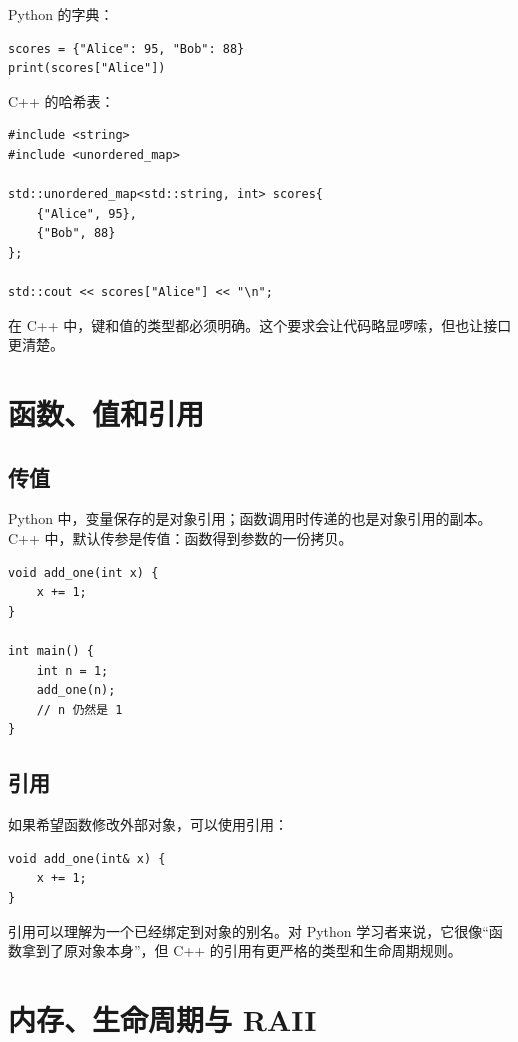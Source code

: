 \documentclass[UTF8,openany]{ctexbook}
\begin{document}
Python 的字典：

\begin{lstlisting}[style=pythonstyle]
scores = {"Alice": 95, "Bob": 88}
print(scores["Alice"])
\end{lstlisting}

C++ 的哈希表：

\begin{lstlisting}[style=cppstyle]
#include <string>
#include <unordered_map>

std::unordered_map<std::string, int> scores{
    {"Alice", 95},
    {"Bob", 88}
};

std::cout << scores["Alice"] << "\n";
\end{lstlisting}

在 C++ 中，键和值的类型都必须明确。这个要求会让代码略显啰嗦，但也让接口更清楚。

\chapter{函数、值和引用}

\section{传值}

Python 中，变量保存的是对象引用；函数调用时传递的也是对象引用的副本。C++ 中，默认传参是传值：函数得到参数的一份拷贝。

\begin{lstlisting}[style=cppstyle]
void add_one(int x) {
    x += 1;
}

int main() {
    int n = 1;
    add_one(n);
    // n 仍然是 1
}
\end{lstlisting}

\section{引用}

如果希望函数修改外部对象，可以使用引用：

\begin{lstlisting}[style=cppstyle]
void add_one(int& x) {
    x += 1;
}
\end{lstlisting}

引用可以理解为一个已经绑定到对象的别名。对 Python 学习者来说，它很像“函数拿到了原对象本身”，但 C++ 的引用有更严格的类型和生命周期规则。

\chapter{内存、生命周期与 RAII}
\end{document}
